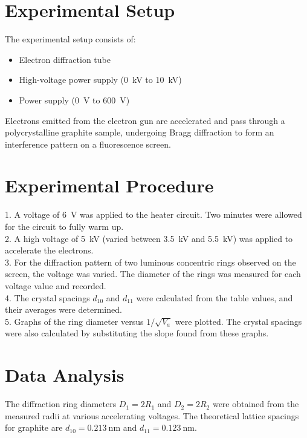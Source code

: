 \documentclass[journal]{IEEEtran}
\begin{document}
\section{Experimental Setup}
The experimental setup consists of:
\begin{itemize}
    \item Electron diffraction tube
    \item High-voltage power supply (\SI{0}{\kilo\volt} to \SI{10}{\kilo\volt})
    \item Power supply (\SI{0}{\volt} to \SI{600}{\volt})
\end{itemize}
Electrons emitted from the electron gun are accelerated and pass through a polycrystalline graphite sample, undergoing Bragg diffraction to form an interference pattern on a fluorescence screen.

\section{Experimental Procedure}
1. A voltage of \SI{6}{\volt} was applied to the heater circuit. Two minutes were allowed for the circuit to fully warm up. \\
2. A high voltage of \SI{5}{\kilo\volt} (varied between \SI{3.5}{\kilo\volt} and \SI{5.5}{\kilo\volt}) was applied to accelerate the electrons. \\
3. For the diffraction pattern of two luminous concentric rings observed on the screen, the voltage was varied. The diameter of the rings was measured for each voltage value and recorded. \\
4. The crystal spacings $d_{10}$ and $d_{11}$ were calculated from the table values, and their averages were determined. \\
5. Graphs of the ring diameter versus $1/\sqrt{V_a}$ were plotted. The crystal spacings were also calculated by substituting the slope found from these graphs.

\section{Data Analysis}
The diffraction ring diameters $D_1 = 2R_1$ and $D_2 = 2R_2$ were obtained from the measured radii at various accelerating voltages. The theoretical lattice spacings for graphite are $d_{10} = \SI{0.213}{\nano\meter}$ and $d_{11} = \SI{0.123}{\nano\meter}$.
\end{document}
